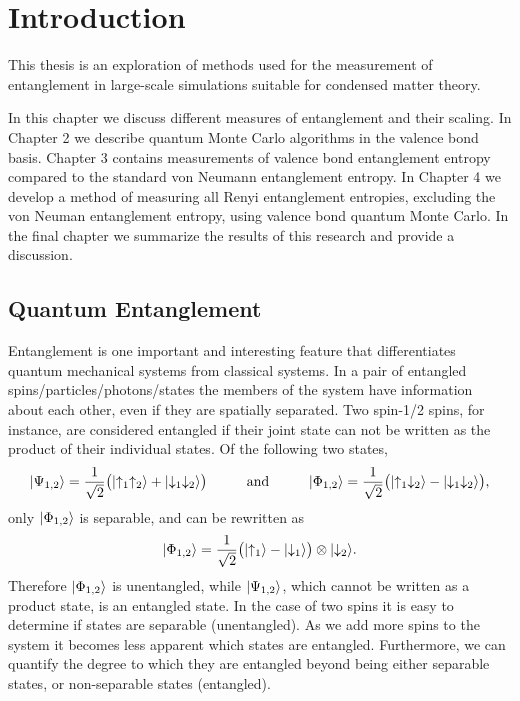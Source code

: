 \chapter{Introduction}
This thesis is an exploration of methods used for the measurement of entanglement in large-scale simulations suitable for condensed matter theory.

In this chapter we discuss different measures of entanglement and their scaling.
In Chapter 2 we describe quantum Monte Carlo algorithms in the valence bond basis.
Chapter 3 contains measurements of valence bond entanglement entropy compared to the standard von Neumann entanglement entropy.
In Chapter 4 we develop a method of measuring all Renyi entanglement entropies, excluding the von Neuman entanglement entropy, using valence bond quantum Monte Carlo.
In the final chapter we summarize the results of this research and provide a discussion.

\section{Quantum Entanglement}
Entanglement is one important and interesting feature that differentiates quantum mechanical systems from classical systems.
In a pair of entangled spins/particles/photons/states the members of the system have information about each other, even if they are spatially separated.
Two spin-1/2 spins, for instance, are considered entangled if their joint state can not be written as the product of their individual states.  Of the following two states,
\begin{equation}
	\lvert {\Psi_{1,2}} \rangle = \frac{1}{\sqrt{2}} \big( \lvert {\uparrow_1\uparrow_2} \rangle + \lvert {\downarrow_1\downarrow_2} \rangle\big) 
	\hspace{1cm} \text{and} \hspace{1cm}
	\lvert {\Phi_{1,2}} \rangle = \frac{1}{\sqrt{2}} \big( \lvert {\uparrow_1\downarrow_2} \rangle - \lvert {\downarrow_1\downarrow_2} \rangle\big), 
\end{equation}
only $\lvert {\Phi_{1,2}} \rangle$ is separable, and can be rewritten as
\begin{equation}
	\lvert {\Phi_{1,2}} \rangle = \frac{1}{\sqrt{2}}  \big( \lvert {\uparrow_1} \rangle - \lvert {\downarrow_1} \rangle\big) \otimes \lvert {\downarrow_2} \rangle.
\end{equation}
Therefore $\lvert {\Phi_{1,2}} \rangle$ is unentangled, while $\lvert {\Psi_{1,2}} \rangle$, which cannot be written as a product state, is an entangled state.
In the case of two spins it is easy to determine if states are separable (unentangled). As we add more spins to the system it becomes less apparent which  states are entangled. Furthermore, we can quantify the degree to which they are entangled beyond being either separable states, or non-separable states (entangled).

